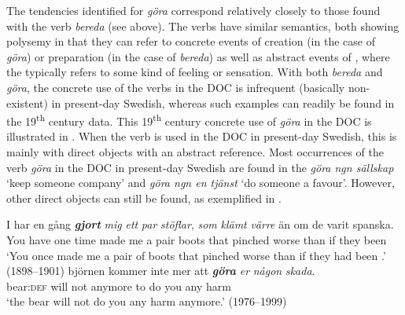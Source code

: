 \documentclass[output=paper]{langscibook}
\begin{document}
\begin{table}
\caption{Frequency measures of the verb-specific DOC with \textit{göra} ‘make, do’\label{tab:valdeson:9}}
\end{table}

The tendencies identified for \textit{göra} correspond relatively closely to those found with the verb \textit{bereda} (see above). The verbs have similar semantics, both showing polysemy in that they can refer to concrete events of creation (in the case of \textit{göra}) or preparation (in the case of \textit{bereda}) as well as abstract events of , where the  typically refers to some kind of feeling or sensation. With both \textit{bereda} and \textit{göra}, the concrete use of the verbs in the DOC is infrequent (basically non-existent) in present-day Swedish, whereas such examples can readily be found in the 19\textsuperscript{th} century data. This 19\textsuperscript{th} century concrete use of \textit{göra} in the DOC is illustrated in . When the verb is used in the DOC in present-day Swedish, this is mainly with direct objects with an abstract reference. Most occurrences of the verb \textit{göra} in the DOC in present-day Swedish are found in the  \textit{göra ngn sällskap} ‘keep someone company’ and \textit{göra ngn en tjänst} ‘do someone a favour’. However, other direct objects can still be found, as exemplified in .


\ea \label{ex:valdeson:10}
\gll I       har  en  gång \textbf{\textit{gjort}} \textit{mig}  \textit{ett} \textit{par} \textit{stöflar},  \textit{som}  \textit{klämt}   \textit{värre} än      om  de   varit  spanska.\\
  You    have    one   time  made  me  a    pair  boots    that  pinched worse than    if        they    been   \\
\glt ‘You once made me a pair of boots that pinched worse than if they had been .’ (1898–1901)
\ex \label{ex:valdeson:11}
\gll björnen  kommer  inte    mer      att \textbf{\textit{göra}} \textit{er}    \textit{någon}  \textit{skada}.\\
  bear:\textsc{def}         will        not  anymore     to  do      you  any     harm\\
\glt `the bear will not do you any harm anymore.’ (1976–1999)
\z
\end{document}
